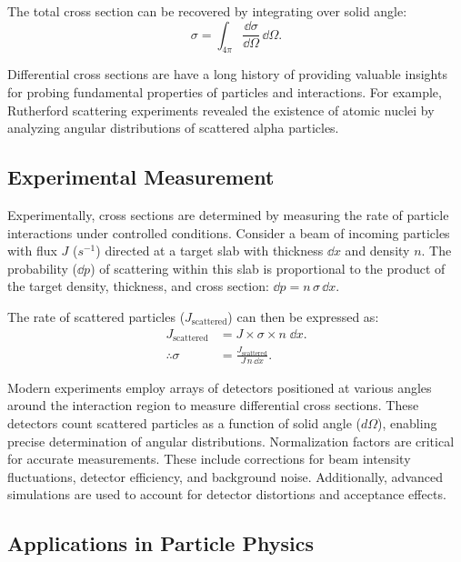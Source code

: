 The total cross section can be recovered by integrating over solid angle:
\begin{equation}
\sigma = \int_{4\pi} \frac{\dd\sigma}{\dd\Omega} \, \dd\Omega.
\end{equation}

Differential cross sections are have a long history of providing valuable insights for probing fundamental properties of particles and interactions.
%
For example, Rutherford scattering experiments revealed the existence of atomic nuclei by analyzing angular distributions of scattered alpha particles.

\subsection{Experimental Measurement}

Experimentally, cross sections are determined by measuring the rate of particle interactions under controlled conditions. Consider a beam of incoming particles with flux \(J\) (\(s^{-1}\)) directed at a target slab with thickness \(\dd x\) and density \(n\).
%
The probability (\(\dd p\)) of scattering within this slab is proportional to the product of the target density, thickness, and cross section: \(\dd p = n \,\sigma\, \dd x\).

The rate of scattered particles (\(J_{\text{scattered}}\)) can then be expressed as:
\begin{align}
J_{\text{scattered}} &= J\times \sigma\times n\; \dd x.\\
\therefore \sigma &= \frac{J_{\text{scattered}}}{J\, n \, \dd x}.
\end{align}


Modern experiments employ arrays of detectors positioned at various angles around the interaction region to measure differential cross sections.
%
These detectors count scattered particles as a function of solid angle (\(d\Omega\)), enabling precise determination of angular distributions.
%
Normalization factors are critical for accurate measurements.
%
These include corrections for beam intensity fluctuations, detector efficiency, and background noise.
%
Additionally, advanced simulations are used to account for detector distortions and acceptance effects.

\subsection{Applications in Particle Physics}

